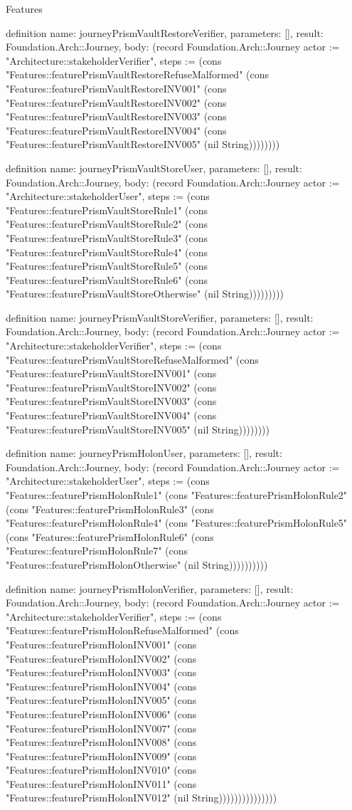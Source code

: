 \begin{lexlean}{Features}
\begin{semanticmodule}
definition{
  name: journeyPrismVaultRestoreVerifier,
  parameters: [],
  result: Foundation.Arch::Journey,
  body: (record Foundation.Arch::Journey {actor := "Architecture::stakeholderVerifier", steps := (cons "Features::featurePrismVaultRestoreRefuseMalformed" (cons "Features::featurePrismVaultRestoreINV001" (cons "Features::featurePrismVaultRestoreINV002" (cons "Features::featurePrismVaultRestoreINV003" (cons "Features::featurePrismVaultRestoreINV004" (cons "Features::featurePrismVaultRestoreINV005" (nil String)))))))})
}

definition{
  name: journeyPrismVaultStoreUser,
  parameters: [],
  result: Foundation.Arch::Journey,
  body: (record Foundation.Arch::Journey {actor := "Architecture::stakeholderUser", steps := (cons "Features::featurePrismVaultStoreRule1" (cons "Features::featurePrismVaultStoreRule2" (cons "Features::featurePrismVaultStoreRule3" (cons "Features::featurePrismVaultStoreRule4" (cons "Features::featurePrismVaultStoreRule5" (cons "Features::featurePrismVaultStoreRule6" (cons "Features::featurePrismVaultStoreOtherwise" (nil String))))))))})
}

definition{
  name: journeyPrismVaultStoreVerifier,
  parameters: [],
  result: Foundation.Arch::Journey,
  body: (record Foundation.Arch::Journey {actor := "Architecture::stakeholderVerifier", steps := (cons "Features::featurePrismVaultStoreRefuseMalformed" (cons "Features::featurePrismVaultStoreINV001" (cons "Features::featurePrismVaultStoreINV002" (cons "Features::featurePrismVaultStoreINV003" (cons "Features::featurePrismVaultStoreINV004" (cons "Features::featurePrismVaultStoreINV005" (nil String)))))))})
}

definition{
  name: journeyPrismHolonUser,
  parameters: [],
  result: Foundation.Arch::Journey,
  body: (record Foundation.Arch::Journey {actor := "Architecture::stakeholderUser", steps := (cons "Features::featurePrismHolonRule1" (cons "Features::featurePrismHolonRule2" (cons "Features::featurePrismHolonRule3" (cons "Features::featurePrismHolonRule4" (cons "Features::featurePrismHolonRule5" (cons "Features::featurePrismHolonRule6" (cons "Features::featurePrismHolonRule7" (cons "Features::featurePrismHolonOtherwise" (nil String)))))))))})
}

definition{
  name: journeyPrismHolonVerifier,
  parameters: [],
  result: Foundation.Arch::Journey,
  body: (record Foundation.Arch::Journey {actor := "Architecture::stakeholderVerifier", steps := (cons "Features::featurePrismHolonRefuseMalformed" (cons "Features::featurePrismHolonINV001" (cons "Features::featurePrismHolonINV002" (cons "Features::featurePrismHolonINV003" (cons "Features::featurePrismHolonINV004" (cons "Features::featurePrismHolonINV005" (cons "Features::featurePrismHolonINV006" (cons "Features::featurePrismHolonINV007" (cons "Features::featurePrismHolonINV008" (cons "Features::featurePrismHolonINV009" (cons "Features::featurePrismHolonINV010" (cons "Features::featurePrismHolonINV011" (cons "Features::featurePrismHolonINV012" (nil String))))))))))))))})
}


\end{semanticmodule}
\end{lexlean}
